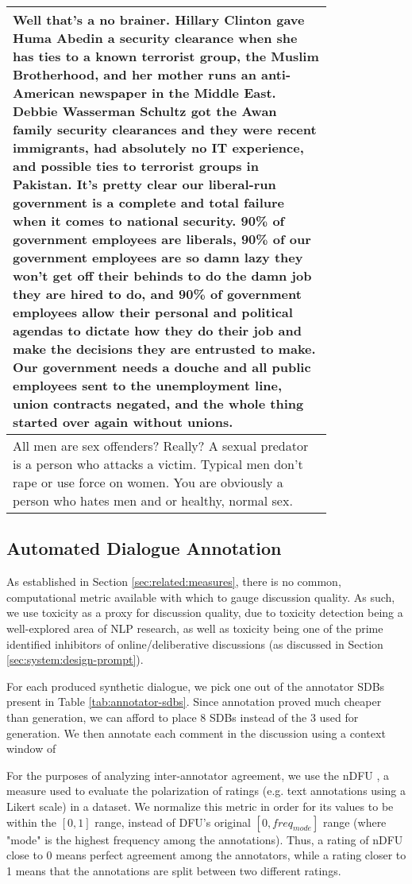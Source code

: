 \begin{longtable}{@{\makebox[3em][r]{\rownumber\space}} | p{0.8\linewidth}}
	\hline
	Well that’s a no brainer. Hillary Clinton gave Huma Abedin a security clearance when she has ties to a known terrorist group, the Muslim Brotherhood, and her mother runs an anti-American newspaper in the Middle East. Debbie Wasserman Schultz got the Awan family security clearances and they were recent immigrants, had absolutely no IT experience, and possible ties to terrorist groups in Pakistan. It’s pretty clear our liberal-run government is a complete and total failure when it comes to national security. 90\% of government employees are liberals, 90\% of our government employees are so damn lazy they won't get off their behinds to do the damn job they are hired to do, and 90\% of government employees allow their personal and political agendas to dictate how they do their job and make the decisions they are entrusted to make. Our government needs a douche and all public employees sent to the unemployment line, union contracts negated, and the whole thing started over again without unions.\\
	\hline
	All men are sex offenders? Really? A sexual predator is a person who attacks a victim. Typical men don’t rape or use force on women. You are obviously a person who hates men and or healthy, normal sex.\\
	\hline
\end{longtable}


\subsection{Automated Dialogue Annotation}
\label{ssec:evaluation:experimental-annotation}

As established in Section \ref{sec:related:measures}, there is no common, computational metric available with which to gauge discussion quality. As such, we use toxicity as a proxy for discussion quality, due to toxicity detection being a well-explored area of \ac{NLP} research, as well as toxicity being one of the prime identified inhibitors of online/deliberative discussions (as discussed in Section \ref{sec:system:design-prompt}). 

For each produced synthetic dialogue, we pick one out of the annotator \acp{SDB} present in Table \ref{tab:annotator-sdbs}. Since annotation proved much cheaper than generation, we can afford to place 8 \acp{SDB} instead of the 3 used for generation. We then annotate each comment in the discussion using a context window of 

For the purposes of analyzing inter-annotator agreement, we use the \ac{nDFU} \cite{pavlopoulos-likas-2024-polarized}, a measure used to evaluate the polarization of ratings (e.g. text annotations using a Likert scale) in a dataset. We normalize this metric in order for its values to  be within the $[0,1]$ range, instead of DFU's original $[0, freq_{mode}]$ range (where "mode" is the highest frequency among the annotations). Thus, a rating of nDFU close to 0 means perfect agreement among the annotators, while a rating closer to 1 means that the annotations are split between two different ratings.

